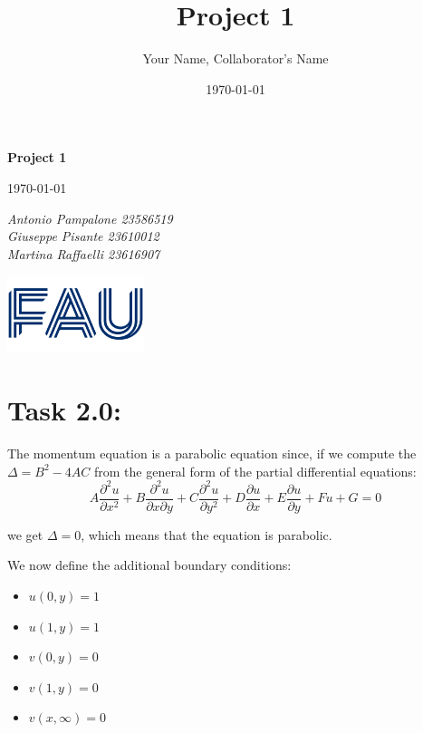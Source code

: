\documentclass{article}
\title{Project 1}
\author{Your Name, Collaborator's Name}
\date{\today}
\begin{document}
\begin{titlepage}
    \centering
    \vspace*{1in}
    
    {\Huge\bfseries Project 1\par}
    \vspace{1.5cm}
    {\Large \today\par}
    \vspace{1.5cm}
    {\Large\itshape Antonio Pampalone 23586519 \\ Giuseppe Pisante 23610012\\ Martina Raffaelli 23616907 \par}
    
    \vfill
    \includegraphics[width=0.3\textwidth]{FAU-Logo.png}\par\vspace{1cm} %
   
\end{titlepage}

\newpage
\small

\section*{\Large Task 2.0:}
The momentum equation is a parabolic equation since, if we compute the $\Delta = B^2 - 4AC$ from the general form of the partial differential equations: 
\[
\]
\begin{equation}
  A \frac{\partial^2 u}{\partial x^2} + B \frac{\partial^2 u}{\partial x \partial y} + C \frac{\partial^2 u}{\partial y^2} + D \frac{\partial u}{\partial x} + E \frac{\partial u}{\partial y} + F u + G = 0
\end{equation}

we get $\Delta = 0$, which means that the equation is parabolic.

We now define the additional boundary conditions:
\begin{itemize}
  \item $u(0,y) = 1$
  \item $u(1,y) = 1$
  \item $v(0,y) = 0$
  \item $v(1,y) = 0$
  \item $v(x,\infty) = 0$
\end{itemize}
\end{document}
